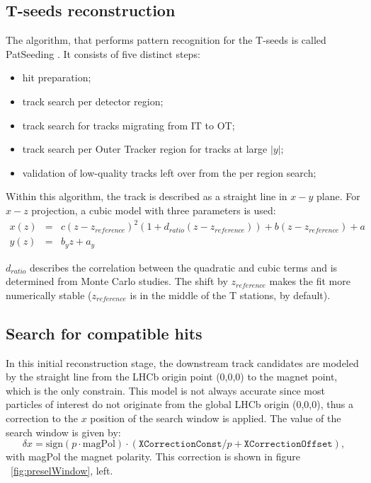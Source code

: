 \subsection{T-seeds reconstruction}
The algorithm, that performs pattern recognition for the T-seeds is called PatSeeding \cite{PatSeeding}. It consists of five distinct steps: 

\begin{itemize}
\item hit preparation;
\item track search per detector region;
\item track search for tracks migrating from IT to OT;
\item track search per Outer Tracker region for tracks at large $|y|$;
\item validation of low-quality tracks left over from the per region search;
\end{itemize}

Within this algorithm, the track is described as a straight line in $x-y$ plane.  For $x-z$ projection, a cubic model with three parameters is used:
\begin{eqnarray}
x(z)&=&c(z-z_{reference})^2(1+d_{ratio}(z-z_{reference})) + b(z-z_{reference})+a \\
y(z)&=&b_{y}z+a_y
\end{eqnarray}

$d_{ratio}$ describes the correlation between the quadratic and cubic terms and is determined from
Monte Carlo studies. The shift by $z_{reference}$ makes the fit more numerically stable ($z_{reference}$ is
in the middle of the T stations, by default).

\subsection{Search for compatible hits}
In this initial reconstruction stage, the downstream track candidates are modeled by the straight line from the LHCb origin point (0,0,0) to the magnet point, which is the only constrain. 
This model is not always accurate since most particles of interest do not originate from the global LHCb origin (0,0,0), thus a correction to the $x$ position of the search window is applied.  The value of the search window is given by: 
\begin{equation}
\delta x = \text{sign}(p\cdot \text{magPol}) \cdot \left( \texttt{XCorrectionConst} / p + \texttt{XCorrectionOffset} \right),
\end{equation}
with magPol the magnet polarity. This correction is  shown in figure ~\ref{fig:preselWindow}, left. 
 
